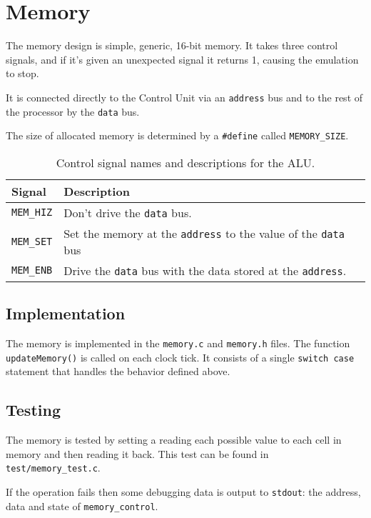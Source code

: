 \documentclass[a4paper]{article}
\begin{document}
\section{Memory}

The memory design is simple, generic, 16-bit memory. It takes three control signals, and if it's given an unexpected signal it returns 1, causing the emulation to stop.

It is connected directly to the Control Unit via an \texttt{address} bus and to the rest of the processor by the \texttt{data} bus.

The size of allocated memory is determined by a \texttt{\#define} called \texttt{MEMORY\_SIZE}.

\begin{table}[H]
\centering
\caption{Control signal names and descriptions for the ALU.}
\begin{tabular}{ll}
	Signal & Description \\
	\hline
	\texttt{MEM\_HIZ} & Don't drive the \texttt{data} bus.\\
	\texttt{MEM\_SET} & Set the memory at the \texttt{address} to the value of the \texttt{data} bus \\
	\texttt{MEM\_ENB} & Drive the \texttt{data} bus with the data stored at the \texttt{address}.\\
\end{tabular}
\end{table}

\subsection{Implementation}

The memory is implemented in the \texttt{memory.c} and \texttt{memory.h} files. The function \texttt{updateMemory()} is called on each clock tick. It consists of a single \texttt{switch case} statement that handles the behavior defined above.

\subsection{Testing}

The memory is tested by setting a reading each possible value to each cell in memory and then reading it back. This test can be found in \verb|test/memory_test.c|.

If the operation fails then some debugging data is output to \texttt{stdout}: the address, data and state of \texttt{memory\_control}.
\end{document}
